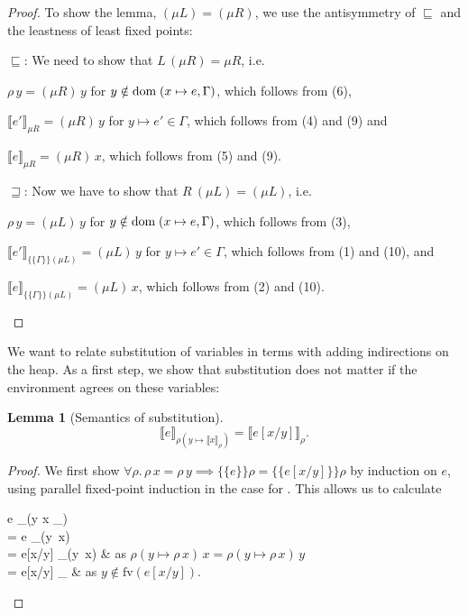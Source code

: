 \documentclass{jfp1}
\newtheorem{lemma}{Lemma}
\theoremstyle{nonumberbreak}
\newtheorem{proof}{Proof}
\newcommand{\keyword}[1]{\text{\textsf{#1}}}
\newcommand{\fv}[1]{\text{fv}(#1)}
\newcommand{\dsem}[2]{\llbracket #1 \rrbracket_{#2}}
\newcommand{\esem}[1]{\{\!\!\!\{#1\}\!\!\!\}}
\begin{document}
\begin{proof}
To show the lemma, $(\mu L) = (\mu R)$, we use the antisymmetry of $\sqsubseteq$ and the leastness of least fixed points:
\begin{compactitem}[$\sqsubseteq$:]
\item[$\sqsubseteq$:] We need to show that $L\, (\mu R) = \mu R$, i.e.
\begin{compactitem}
\item $\rho\,y = (\mu R)\, y$ for $y \notin \text{dom}\;(x\mapsto e,\Gamma)$, which follows from (6),
\item $\dsem{e'}{\mu R} = (\mu R)\, y$ for $y \mapsto e' \in \Gamma$, which follows from (4) and (9) and
\item $\dsem{e}{\mu R} = (\mu R)\, x$, which follows from (5) and (9).
\end{compactitem}
\item[$\sqsupseteq$:] Now we have to show that $R\ (\mu L) = (\mu L)$, i.e.
\begin{compactitem}
\item $\rho\,y = (\mu L)\, y$ for $y \notin \text{dom}\;(x\mapsto e,\Gamma)$, which follows from (3),
\item $\dsem{e'}{\esem{\Gamma}{(\mu L)}} = (\mu L)\, y$ for $y \mapsto e' \in \Gamma$, which follows from (1) and (10), and
\item $\dsem{e}{\esem{\Gamma}{(\mu L)}} = (\mu L)\, x$, which follows from (2) and (10).
\end{compactitem}
\end{compactitem}
\end{proof}

We want to relate substitution of variables in terms with adding indirections on the heap. As a first step, we show that substitution does not matter if the environment agrees on these variables:

\begin{lemma}[Semantics of substitution]
\[
\label{lem:subst}
\dsem{e}{\rho (y \mapsto \dsem{x}\rho)} = \dsem{ e[x/y]}{\rho}.
\]
\end{lemma}

\begin{proof}

We first show $\forall\rho.\, \rho\,x = \rho\,y \implies \esem{e}\rho = \esem{e[x/y]}\rho$ by induction on $e$, using parallel fixed-point induction in the case for \keyword{let}. This allows us to calculate
\begin{conteq}
\dsem{e}{\rho (y \mapsto \dsem{x}\rho)} \\
= \dsem{e}{\rho (y \mapsto \rho\,x)} \\
= \dsem{e[x/y]}{\rho (y \mapsto \rho\,x)} & as $\rho (y \mapsto \rho\,x)\,x=\rho (y \mapsto \rho\,x)\,y$ \\
=  \dsem{e[x/y]}{\rho} & as $y\notin \fv{e[x/y]}$.
\end{conteq}
\end{proof}
\end{document}
